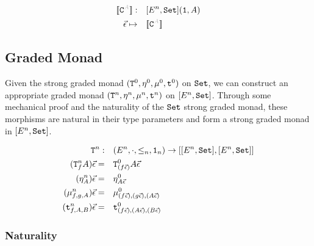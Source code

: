 \documentclass{report}
\begin{document}
\begin{align}
    \deno{\const{A}}:&\quad[E^n, \set](\1, A)\\
    \ev\mapsto&\quad\deno{\const{A}}
\end{align}

\subsection{Graded Monad}
Given the strong graded monad $(\texttt{T}^0_{}, \eta_{}^0{}{}, \mu^0, \texttt{t}^0)$ on $\texttt{Set}$, we can construct an appropriate graded monad $(\texttt{T}^n_{}, \eta_{}^n{}{}, \mu^n,\texttt{t}^n)$ on $[E^n, \texttt{Set}]$. Through some mechanical proof and the naturality of the $\texttt{Set}$ strong graded monad, these morphisms are natural in their type parameters and form a strong graded monad in $[E^n, \texttt{Set}]$.

\begin{align}
    \texttt{T}^n_{}:&\quad(E^n, \cdot, \leq_n, \texttt{1}_n) \rightarrow [[E^n, \texttt{Set}], [E^n, \texttt{Set}]]\\
    (\texttt{T}^n_{f}A)\vec{\epsilon}=&\quad \texttt{T}^0_{(f\vec{\epsilon})}A\vec{\epsilon}\\
    (\eta_{A}^n)\vec{\epsilon}=&\quad\eta_{A\vec{\epsilon}}^0\\
    (\mu_{f, g, A}^n)\vec{\epsilon}=&\quad\mu_{(f\vec{\epsilon}), (g\vec{\epsilon}), (A\vec{\epsilon})}^0\\
    (\texttt{t}_{f, A, B}^n)\vec{\epsilon}=&\quad\texttt{t}_{(f\vec{\epsilon}), (A\vec{\epsilon}), (B\vec{\epsilon})}^0
\end{align}



\subsubsection{Naturality}


\end{document}
